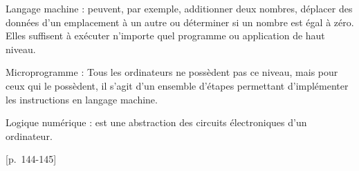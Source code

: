 {{\item[2.] Langage machine : \elide peuvent, par exemple, additionner deux nombres, déplacer des données d'un emplacement à un autre ou déterminer si un nombre est égal à zéro. Elles suffisent à exécuter n'importe quel programme ou application de haut niveau.
\item[1.] Microprogramme : Tous les ordinateurs ne possèdent pas ce niveau, mais pour ceux qui le possèdent, il s'agit d'un ensemble d'étapes permettant d'implémenter les instructions en langage machine.
\item[0.] Logique numérique : \elide est une abstraction des circuits électroniques d'un ordinateur.
}{[p.~144-145]}

}{}

